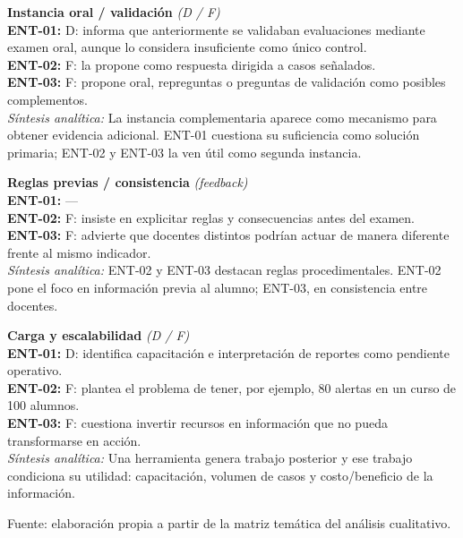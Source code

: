 \begin{center}
\begin{infobox}
\textbf{\textcolor{accent}{Instancia oral / validación}} \textit{(D / F)}\\
\textbf{ENT-01:} D: informa que anteriormente se validaban evaluaciones mediante examen oral, aunque lo considera insuficiente como único control.\\
\textbf{ENT-02:} F: la propone como respuesta dirigida a casos señalados.\\
\textbf{ENT-03:} F: propone oral, repreguntas o preguntas de validación como posibles complementos.\\
\textit{Síntesis analítica:} La instancia complementaria aparece como mecanismo para obtener evidencia adicional. ENT-01 cuestiona su suficiencia como solución primaria; ENT-02 y ENT-03 la ven útil como segunda instancia.
\end{infobox}
\vspace{2pt}
\begin{infobox}
\textbf{\textcolor{accent}{Reglas previas / consistencia}} \textit{(feedback)}\\
\textbf{ENT-01:} ---\\
\textbf{ENT-02:} F: insiste en explicitar reglas y consecuencias antes del examen.\\
\textbf{ENT-03:} F: advierte que docentes distintos podrían actuar de manera diferente frente al mismo indicador.\\
\textit{Síntesis analítica:} ENT-02 y ENT-03 destacan reglas procedimentales. ENT-02 pone el foco en información previa al alumno; ENT-03, en consistencia entre docentes.
\end{infobox}
\vspace{2pt}
\begin{infobox}
\textbf{\textcolor{accent}{Carga y escalabilidad}} \textit{(D / F)}\\
\textbf{ENT-01:} D: identifica capacitación e interpretación de reportes como pendiente operativo.\\
\textbf{ENT-02:} F: plantea el problema de tener, por ejemplo, 80 alertas en un curso de 100 alumnos.\\
\textbf{ENT-03:} F: cuestiona invertir recursos en información que no pueda transformarse en acción.\\
\textit{Síntesis analítica:} Una herramienta genera trabajo posterior y ese trabajo condiciona su utilidad: capacitación, volumen de casos y costo/beneficio de la información.
\end{infobox}
\vspace{2pt}
\end{center}
Fuente: elaboración propia a partir de la matriz temática del análisis cualitativo.

